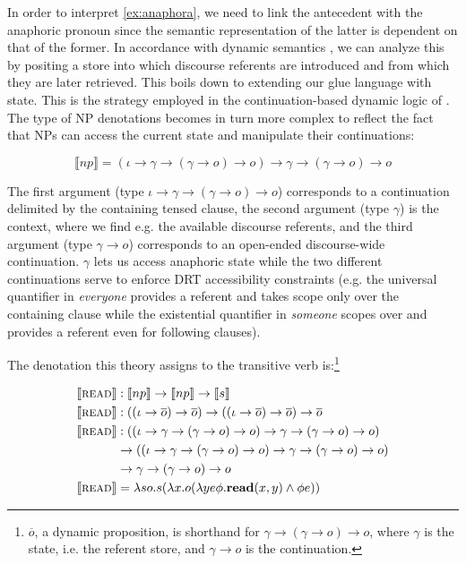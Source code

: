 \documentclass{article}
\newcommand{\sem}[1]{\llbracket #1 \rrbracket}
\begin{document}
In order to interpret \eqref{ex:anaphora}, we need to link the antecedent with
the anaphoric pronoun since the semantic representation of the latter is
dependent on that of the former. In accordance with dynamic semantics
\citep{kamp1993discourse}, we can analyze this by positing a store into which
discourse referents are introduced and from which they are later
retrieved. This boils down to extending our glue language with state. This is
the strategy employed in the continuation-based dynamic logic of
\citet{de2006towards}. The type of NP denotations becomes in turn more complex
to reflect the fact that NPs can access the current state and manipulate their
continuations:

\vspace{-1mm}

$$
\sem{np} = (\iota \to \gamma \to (\gamma \to o) \to o) \to \gamma \to (\gamma
\to o) \to o
$$

The first argument (type $\iota \to \gamma \to (\gamma \to o) \to o$)
corresponds to a continuation delimited by the containing tensed clause, the
second argument (type $\gamma$) is the context, where we find e.g. the
available discourse referents, and the third argument (type $\gamma \to o$)
corresponds to an open-ended discourse-wide continuation. $\gamma$ lets us
access anaphoric state while the two different continuations serve to enforce
DRT accessibility constraints \citep{kamp1993discourse} (e.g. the universal
quantifier in \emph{everyone} provides a referent and takes scope only over
the containing clause while the existential quantifier in \emph{someone}
scopes over and provides a referent even for following clauses).

The denotation this theory assigns to the transitive verb
is:\footnote{$\overline{o}$, a dynamic proposition, is shorthand for $\gamma
  \to (\gamma \to o) \to o$, where $\gamma$ is the state, i.e. the referent
  store, and $\gamma \to o$ is the continuation.}

\begin{align*}
  \sem{\textsc{read}} & : \sem{np} \to \sem{np} \to \sem{s} \\
  \sem{\textsc{read}} & : ((\iota \to \overline{o}) \to \overline{o}) \to
                          ((\iota \to \overline{o}) \to \overline{o}) \to
                          \overline{o} \\
  \sem{\textsc{read}} & : ((\iota \to \gamma \to (\gamma \to o) \to o)
                           \to \gamma \to (\gamma \to o) \to o) \\ & \to
                          ((\iota \to \gamma \to (\gamma \to o) \to o)
                           \to \gamma \to (\gamma \to o) \to o) \\ & \to
                           \gamma \to (\gamma \to o) \to o \\
  \sem{\textsc{read}} & = \lambda s o. s (\lambda x. o (\lambda y e
  \phi. \textbf{read}(x, y) \land \phi e))
\end{align*}
\end{document}
